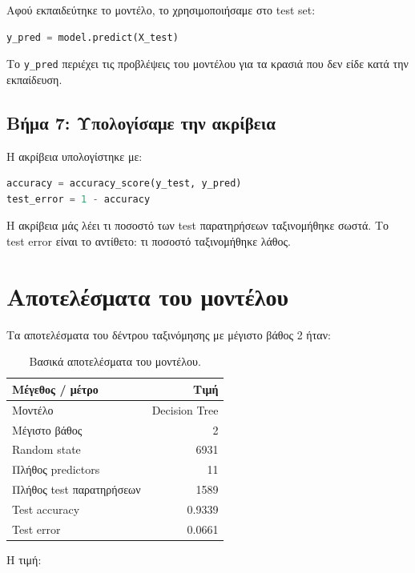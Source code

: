\documentclass[12pt,a4paper]{article}
\newcommand{\code}[1]{\texttt{\textenglish{#1}}}
\begin{document}
Αφού εκπαιδεύτηκε το μοντέλο, το χρησιμοποιήσαμε στο test set:

\begin{lstlisting}[language=Python]
y_pred = model.predict(X_test)
\end{lstlisting}

Το \code{y\_pred} περιέχει τις προβλέψεις του μοντέλου για τα κρασιά που δεν
είδε κατά την εκπαίδευση.

\subsection{Βήμα 7: Υπολογίσαμε την ακρίβεια}

Η ακρίβεια υπολογίστηκε με:

\begin{lstlisting}[language=Python]
accuracy = accuracy_score(y_test, y_pred)
test_error = 1 - accuracy
\end{lstlisting}

Η ακρίβεια μάς λέει τι ποσοστό των test παρατηρήσεων ταξινομήθηκε σωστά.
Το test error είναι το αντίθετο: τι ποσοστό ταξινομήθηκε λάθος.

\section{Αποτελέσματα του μοντέλου}

Τα αποτελέσματα του δέντρου ταξινόμησης με μέγιστο βάθος 2 ήταν:

\begin{table}[H]
\centering
\caption{Βασικά αποτελέσματα του μοντέλου.}
\begin{tabular}{lr}
\toprule
\textbf{Μέγεθος / μέτρο} & \textbf{Τιμή} \\
\midrule
Μοντέλο & Decision Tree \\
Μέγιστο βάθος & 2 \\
Random state & 6931 \\
Πλήθος predictors & 11 \\
Πλήθος test παρατηρήσεων & 1589 \\
Test accuracy & 0.9339 \\
Test error & 0.0661 \\
\bottomrule
\end{tabular}
\end{table}

Η τιμή:
\end{document}
